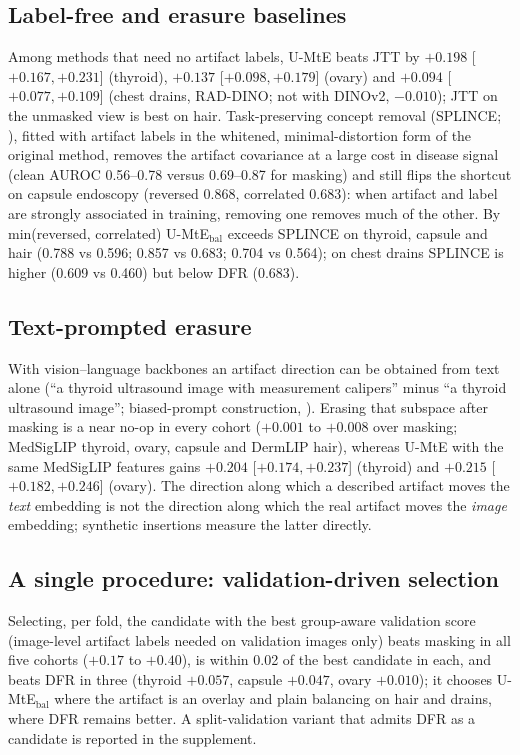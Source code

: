 \subsection{Label-free and erasure baselines}
Among methods that need no artifact labels, U-MtE beats JTT \citep{liu2021jtt} by $+0.198$ [$+0.167, +0.231$]
(thyroid), $+0.137$ [$+0.098, +0.179$] (ovary) and $+0.094$ [$+0.077, +0.109$] (chest drains, RAD-DINO; not with DINOv2, $-0.010$); JTT on the unmasked
view is best on hair. Task-preserving concept removal (SPLINCE; \citealp{splice2025}), fitted with artifact labels in the whitened,
minimal-distortion form of the original method, removes the artifact covariance at a large cost in disease signal
(clean AUROC 0.56--0.78 versus 0.69--0.87 for masking) and still flips the shortcut on capsule endoscopy (reversed
0.868, correlated 0.683): when artifact and label are strongly associated in training, removing one removes much of
the other. By min(reversed, correlated) U-MtE$_{\text{bal}}$ exceeds SPLINCE on thyroid, capsule and hair (0.788 vs
0.596; 0.857 vs 0.683; 0.704 vs 0.564); on chest drains SPLINCE is higher (0.609 vs 0.460) but below DFR (0.683).

\subsection{Text-prompted erasure}
With vision--language backbones an artifact direction can be obtained from text alone (``a thyroid ultrasound image
with measurement calipers'' minus ``a thyroid ultrasound image''; biased-prompt construction, \citealp{chuang2023debiasing}).
Erasing that subspace after masking is a near no-op in every cohort ($+0.001$ to $+0.008$ over masking; MedSigLIP
thyroid, ovary, capsule and DermLIP hair), whereas U-MtE with the same MedSigLIP features gains $+0.204$
[$+0.174, +0.237$] (thyroid) and $+0.215$ [$+0.182, +0.246$] (ovary). The direction along which a described artifact
moves the \emph{text} embedding is not the direction along which the real artifact moves the \emph{image} embedding;
synthetic insertions measure the latter directly.

\subsection{A single procedure: validation-driven selection}
Selecting, per fold, the candidate with the best group-aware validation score (image-level artifact labels needed on
validation images only) beats masking in all five cohorts ($+0.17$ to $+0.40$), is within 0.02 of the best
candidate in each, and beats DFR in three (thyroid $+0.057$, capsule $+0.047$, ovary $+0.010$); it chooses
U-MtE$_{\text{bal}}$ where the artifact is an overlay and plain balancing on hair and drains, where DFR remains
better. A split-validation variant that admits DFR as a candidate is reported in the supplement.

